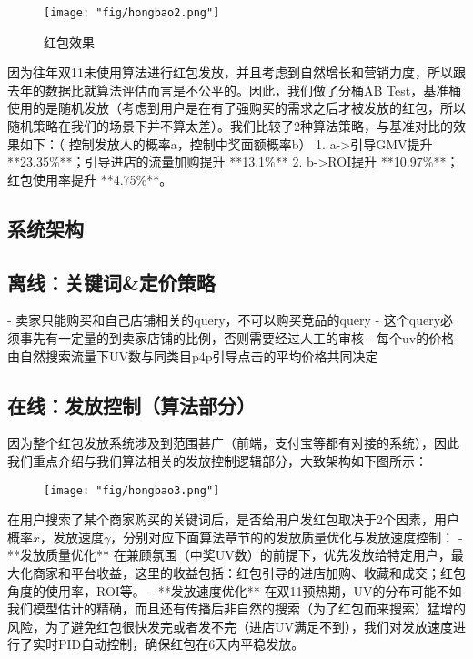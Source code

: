 \begin{figure}[!h]
	\centering
	\texttt{[image: "fig/hongbao2.png"]}
	\caption{红包效果}
	\label{fig:hongbao2}
\end{figure}

因为往年双11未使用算法进行红包发放，并且考虑到自然增长和营销力度，所以跟去年的数据比就算法评估而言是不公平的。因此，我们做了分桶AB Test，基准桶使用的是随机发放（考虑到用户是在有了强购买的需求之后才被发放的红包，所以随机策略在我们的场景下并不算太差）。我们比较了2种算法策略，与基准对比的效果如下：（ 控制发放人的概率a，控制中奖面额概率b）
 1. a->引导GMV提升 **23.35\%**；引导进店的流量加购提升 **13.1\%**
 2. b->ROI提升 **10.97\%**；红包使用率提升 **4.75\%**。

\subsection{系统架构}
\subsection{离线：关键词\&定价策略}
- 卖家只能购买和自己店铺相关的query，不可以购买竞品的query
- 这个query必须事先有一定量的到卖家店铺的比例，否则需要经过人工的审核
- 每个uv的价格由自然搜索流量下UV数与同类目p4p引导点击的平均价格共同决定

\subsection{在线：发放控制（算法部分）}
因为整个红包发放系统涉及到范围甚广（前端，支付宝等都有对接的系统），因此我们重点介绍与我们算法相关的发放控制逻辑部分，大致架构如下图所示：

\begin{figure}[!h]
	\centering
	\texttt{[image: "fig/hongbao3.png"]}
	\caption{}
	\label{fig:hongbao3}
\end{figure}

在用户搜索了某个商家购买的关键词后，是否给用户发红包取决于2个因素，用户概率$x$，发放速度$\gamma$，分别对应下面算法章节的的发放质量优化与发放速度控制：
- **发放质量优化** 在兼顾氛围（中奖UV数）的前提下，优先发放给特定用户，最大化商家和平台收益，这里的收益包括：红包引导的进店加购、收藏和成交；红包角度的使用率，ROI等。
- **发放速度优化** 在双11预热期，UV的分布可能不如我们模型估计的精确，而且还有传播后非自然的搜索（为了红包而来搜索）猛增的风险，为了避免红包很快发完或者发不完（进店UV满足不到），我们对发放速度进行了实时PID自动控制，确保红包在6天内平稳发放。

